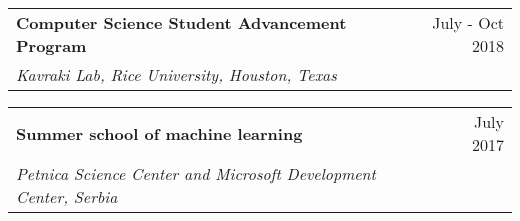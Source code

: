 \documentclass[a4paper,12pt]{article}
\begin{document}
\begin{tabularx}{\linewidth}{ @{}l r@{} }
\textbf{Computer Science Student Advancement Program} & \hfill \qquad \qquad \qquad \qquad \qquad \qquad  July - Oct 2018 \\
\textit{Kavraki Lab, Rice University, Houston, Texas} & \\[3.75pt]
\end{tabularx}

\begin{tabularx}{\linewidth}{ @{}l r@{} }
\textbf{Summer school of machine learning} & \hfill \qquad \qquad \qquad \qquad \qquad  \quad July 2017 \\
\textit{Petnica Science Center and Microsoft Development Center, Serbia} & \\[3.75pt]
\end{tabularx}
\end{document}
